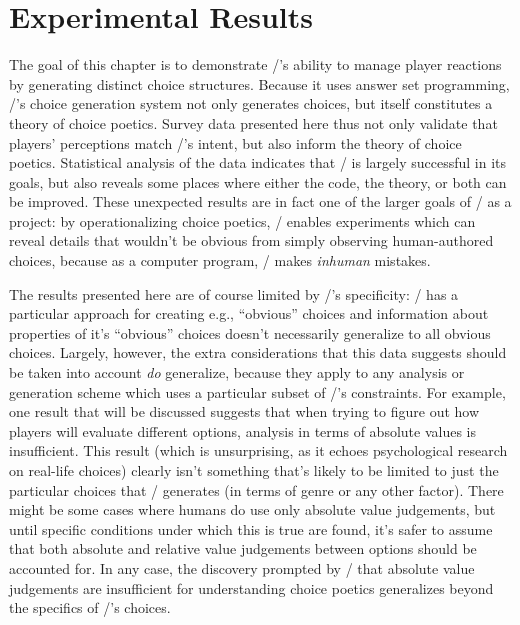\chapter{Experimental Results}

\label{ch:results}


The goal of this chapter is to demonstrate \dunyazad/'s ability to manage player reactions by generating distinct choice structures.
%
Because it uses answer set programming, \dunyazad/'s choice generation system not only generates choices, but itself constitutes a theory of choice poetics.
%
Survey data presented here thus not only validate that players' perceptions match \dunyazad/'s intent, but also inform the theory of choice poetics.
%
Statistical analysis of the data indicates that \dunyazad/ is largely successful in its goals, but also reveals some places where either the code, the theory, or both can be improved. 
%
These unexpected results are in fact one of the larger goals of \dunyazad/ as a project: by operationalizing choice poetics, \dunyazad/ enables experiments which can reveal details that wouldn't be obvious from simply observing human-authored choices, because as a computer program, \dunyazad/ makes \emph{inhuman} mistakes.


The results presented here are of course limited by \dunyazad/'s specificity: \dunyazad/ has a particular approach for creating e.g., ``obvious'' choices and information about properties of it's ``obvious'' choices doesn't necessarily generalize to all obvious choices.
%
Largely, however, the extra considerations that this data suggests should be taken into account \emph{do} generalize, because they apply to any analysis or generation scheme which uses a particular subset of \dunyazad/'s constraints.
%
For example, one result that will be discussed suggests that when trying to figure out how players will evaluate different options, analysis in terms of absolute values is insufficient.
%
This result (which is unsurprising, as it echoes psychological research on real-life choices) clearly isn't something that's likely to be limited to just the particular choices that \dunyazad/ generates (in terms of genre or any other factor).
%
There might be some cases where humans do use only absolute value judgements, but until specific conditions under which this is true are found, it's safer to assume that both absolute and relative value judgements between options should be accounted for.
%
In any case, the discovery prompted by \dunyazad/ that absolute value judgements are insufficient for understanding choice poetics generalizes beyond the specifics of \dunyazad/'s choices.


